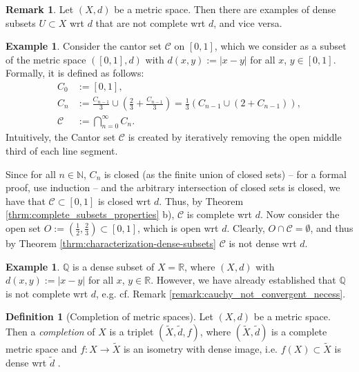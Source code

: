 \documentclass[12pt, a4paper]{article}
\numberwithin{equation}{section}
\theoremstyle{definition}
\theoremstyle{definition}
\newtheorem{defn}[thm]{Definition} %
\newtheorem{exmp}[thm]{Example} %
\newtheorem{remark}[thm]{Remark} %
\newcommand{\abs}[1]{\left\vert #1 \right\vert}
\begin{document}
	\begin{remark}
		Let $(X, d)$ be a metric space. Then there are examples of dense subsets $U\subset X$ wrt $d$ that are not complete wrt $d$, and vice versa.
	\end{remark}

	\begin{exmp}
		Consider the cantor set $\mathcal C$ on $[0, 1]$, which we consider as a subset of the metric space $\left([0, 1], d\right)$ with $d(x, y) := \abs{x - y}$ for all $x$, $y\in[0, 1]$. Formally, it is defined as follows:
		\begin{align}
			C_{0} &:= [0, 1],
			\\ C_{n} &:= \frac{C_{n-1}}{3} \cup \left(\frac{2}{3} + \frac{C_{n-1}}{3}\right) = \frac{1}{3}\left(C_{n-1} \cup \left( 2 + C_{n-1} \right)\right),
			\\ \mathcal C &:= \bigcap_{n=0}^{\infty}C_n.
		\end{align} 
		Intuitively, the Cantor set $\mathcal C$ is created by iteratively removing the open middle third of each line segment.
	
		Since for all $n\in\mathbb N$, $C_n$ is closed (as the finite union of closed sets) -- for a formal proof, use induction -- and the arbitrary intersection of closed sets is closed, we have that $\mathcal C\subset [0, 1]$ is closed wrt $d$. Thus, by Theorem \ref{thrm:complete_subsets_properties} b), $\mathcal C$ is complete wrt $d$. Now consider the open set $O := \left(\frac{1}{2}, \frac{2}{3}\right) \subset [0, 1]$, which is open wrt $d$. Clearly, $O\cap \mathcal C = \emptyset$, and thus by Theorem \ref{thrm:characterization-dense-subsets} $\mathcal C$ is not dense wrt $d$.
	\end{exmp}

	\begin{exmp}
		$\mathbb Q$ is a dense subset of $X = \mathbb R$, where $\left(X, d\right)$ with $d(x, y) := \abs{x-y}$ for all $x$, $y\in\mathbb R$. However, we have already established that $\mathbb Q$ is not complete wrt $d$, e.g. cf. Remark \ref{remark:cauchy_not_convergent_necess}.
	\end{exmp}
	
	\begin{defn}[Completion of metric spaces]
		Let $(X, d)$ be a metric space. Then a \textit{completion} of $X$ is a triplet $\left(\tilde{X}, \tilde{d}, f\right)$, where $\left(\tilde{X}, \tilde{d}\right)$ is a complete metric space and $f: X\to\tilde{X}$ is an isometry with dense image, i.e. $f(X)\subset \tilde{X}$ is dense wrt $\tilde{d}$ \cite[Def. 2.2]{src:completion_metric_spaces}.
	\end{defn}
\end{document}
